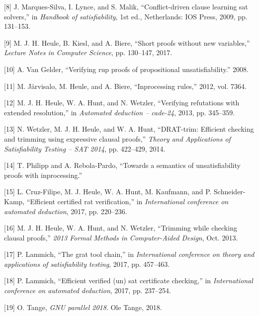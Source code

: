 \documentclass[
]{report}
\begin{document}
\leavevmode\hypertarget{ref-cdcl}{}%
{[}8{]} J. Marques-Silva, I. Lynce, and S. Malik, ``Conflict-driven
clause learning sat solvers,'' in \emph{Handbook of satisfiability}, 1st
ed., Netherlands: IOS Press, 2009, pp. 131--153.

\leavevmode\hypertarget{ref-Heule_2017}{}%
{[}9{]} M. J. H. Heule, B. Kiesl, and A. Biere, ``Short proofs without
new variables,'' \emph{Lecture Notes in Computer Science}, pp. 130--147,
2017.

\leavevmode\hypertarget{ref-rup}{}%
{[}10{]} A. Van Gelder, ``Verifying rup proofs of propositional
unsatisfiability.'' 2008.

\leavevmode\hypertarget{ref-inprocessingrules}{}%
{[}11{]} M. Järvisalo, M. Heule, and A. Biere, ``Inprocessing rules,''
2012, vol. 7364.

\leavevmode\hypertarget{ref-rat}{}%
{[}12{]} M. J. H. Heule, W. A. Hunt, and N. Wetzler, ``Verifying
refutations with extended resolution,'' in \emph{Automated deduction --
cade-24}, 2013, pp. 345--359.

\leavevmode\hypertarget{ref-Wetzler_2014}{}%
{[}13{]} N. Wetzler, M. J. H. Heule, and W. A. Hunt, ``DRAT-trim:
Efficient checking and trimming using expressive clausal proofs,''
\emph{Theory and Applications of Satisfiability Testing -- SAT 2014},
pp. 422--429, 2014.

\leavevmode\hypertarget{ref-philipp_rebola_unsatproofs}{}%
{[}14{]} T. Philipp and A. Rebola-Pardo, ``Towards a semantics of
unsatisfiability proofs with inprocessing.''

\leavevmode\hypertarget{ref-cruz2017efficient}{}%
{[}15{]} L. Cruz-Filipe, M. J. Heule, W. A. Hunt, M. Kaufmann, and P.
Schneider-Kamp, ``Efficient certified rat verification,'' in
\emph{International conference on automated deduction}, 2017, pp.
220--236.

\leavevmode\hypertarget{ref-Heule_2013}{}%
{[}16{]} M. J. H. Heule, W. A. Hunt, and N. Wetzler, ``Trimming while
checking clausal proofs,'' \emph{2013 Formal Methods in Computer-Aided
Design}, Oct. 2013.

\leavevmode\hypertarget{ref-lammich2017grat}{}%
{[}17{]} P. Lammich, ``The grat tool chain,'' in \emph{International
conference on theory and applications of satisfiability testing}, 2017,
pp. 457--463.

\leavevmode\hypertarget{ref-lammich2017efficient}{}%
{[}18{]} P. Lammich, ``Efficient verified (un) sat certificate
checking,'' in \emph{International conference on automated deduction},
2017, pp. 237--254.

\leavevmode\hypertarget{ref-Tange2018}{}%
{[}19{]} O. Tange, \emph{GNU parallel 2018}. Ole Tange, 2018.
\end{document}
